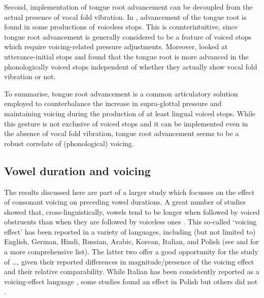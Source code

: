 \documentclass[12pt,]{article}
\begin{document}
Second, implementation of tongue root advancement can be decoupled from
the actual presence of vocal fold vibration. In \citet{westbury1983},
advancement of the tongue root is found in some productions of voiceless
stops. This is counterintuitive, since tongue root advancement is
generally considered to be a feature of voiced stops which require
voicing-related pressure adjustments. Moreover,
\citet{ahn2015, ahn2016, ahn2018} looked at utterance-initial stops and
found that the tongue root is more advanced in the phonologically voiced
stops independent of whether they actually show vocal fold vibration or
not.

To summarise, tongue root advancement is a common articulatory solution
employed to counterbalance the increase in supra-glottal pressure and
maintaining voicing during the production of at least lingual voiced
stops. While this gesture is not exclusive of voiced stops and it can be
implemented even in the absence of vocal fold vibration, tongue root
advancement seems to be a robust correlate of (phonological) voicing.

\hypertarget{vowel-duration-and-voicing}{%
\subsection{Vowel duration and
voicing}\label{vowel-duration-and-voicing}}

The results discussed here are part of a larger study which focusses on
the effect of consonant voicing on preceding vowel durations. A great
number of studies showed that, cross-linguistically, vowels tend to be
longer when followed by voiced obstruents than when they are followed by
voiceless ones
\citep{house1953, peterson1960, chen1970, klatt1973, lisker1974, farnetani1986, fowler1992, hussein1994, esposito2002, lampp2004, durvasula2012}.
This so-called `voicing effect' has been reported in a variety of
languages, including (but not limited to) English, German, Hindi,
Russian, Arabic, Korean, Italian, and Polish (see
\citealt{maddieson1976} and \citealt{begus2017} for a more comprehensive
list). The latter two offer a good opportunity for the study of
\ldots{}, given their reported differences in magnitude/presence of the
voicing effect and their relative comparability. While Italian has been
consistently reported as a voicing-effect language
\citep{caldognetto1979, farnetani1986, esposito2002}, some studies found
an effect in Polish
\citet{slowiaczek1985, nowak2006, malisz2008, coretta2018j} but others
did not \citep{keating1984, jassem1989}.
\end{document}
